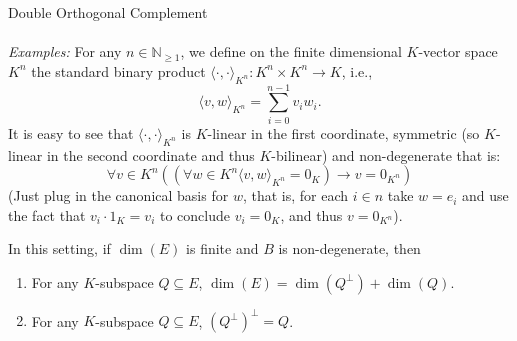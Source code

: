\begin{appendixitem}{Double Orthogonal Complement}
    \\\\
    \textit{Examples:} For any \( n\in\mathbb{N}_{\geq 1} \), we define on the finite dimensional \( K \)-vector space \( K^n \) the standard binary product \( \langle\cdot,\cdot\rangle_{K^n}: K^n\times K^n\rightarrow K \), i.e.,
    \[
        \langle v, w \rangle_{K^n} = \sum_{i=0}^{n-1} v_i w_i.
    \]
    It is easy to see that \( \langle \cdot, \cdot \rangle_{K^n} \) is \( K \)-linear in the first coordinate, symmetric (so \( K \)-linear in the second coordinate and thus \( K \)-bilinear) and non-degenerate that is:
    \[
        \forall v\in K^n\left(\left(\forall w\in K^n \langle v,w\rangle_{K^n}=0_K\right) \rightarrow v=0_{K^n}\right)
    \]
    (Just plug in the canonical basis for \( w \), that is, for each \( i\in n \) take \( w=e_i \) and use the fact that \( v_i\cdot 1_{K}=v_i \) to conclude \( v_i=0_K \), and thus \( v=0_{K^n} \)).
    \begin{theorem}
        In this setting, if \( \dim\left(E\right) \) is finite and \( B \) is non-degenerate, then
        \begin{enumerate}
            \item For any \( K \)-subspace \( Q \subseteq E \), \( \dim\left(E\right)=\dim\left(Q^{\perp}\right) + \dim\left(Q\right) \).
            \item For any \( K \)-subspace \( Q \subseteq E \), \( \left(Q^{\perp}\right)^{\perp} = Q \).
        \end{enumerate}
    \end{theorem}


\end{appendixitem}
